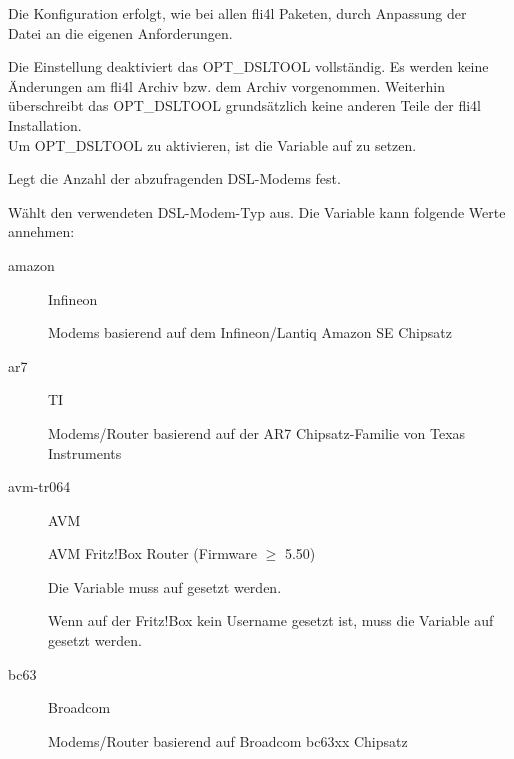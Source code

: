   Die Konfiguration erfolgt, wie bei allen fli4l Paketen, durch Anpassung der \\
  Datei 
  an die eigenen Anforderungen.

\begin{description}


  Die Einstellung  deaktiviert das OPT\_DSLTOOL vollständig. Es werden
  keine Änderungen am fli4l Archiv  bzw. dem Archiv 
  vorgenommen. Weiterhin überschreibt das OPT\_DSLTOOL grundsätzlich keine anderen
  Teile der fli4l Installation.\\
  Um OPT\_DSLTOOL zu aktivieren, ist die Variable  auf
   zu setzen.


  Legt die Anzahl der abzufragenden DSL-Modems fest.


  Wählt den verwendeten DSL-Modem-Typ aus. Die Variable kann folgende Werte
  annehmen:
\begin{description}
\item[amazon] Infineon 

  Modems basierend auf dem Infineon/Lantiq Amazon SE Chipsatz

\item[ar7] TI 

  Modems/Router basierend auf der AR7 Chipsatz-Familie von Texas Instruments

\item[avm-tr064] AVM 

  AVM Fritz!Box Router (Firmware $\ge$ 5.50)

  Die Variable  muss
  auf  gesetzt werden.
  
  Wenn auf der Fritz!Box kein Username gesetzt ist, muss die Variable 
  auf  gesetzt werden.

\item[bc63] Broadcom 

  Modems/Router basierend auf Broadcom bc63xx Chipsatz


\end{description}
\end{description}
